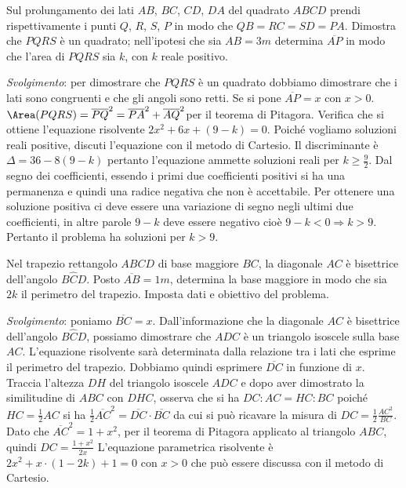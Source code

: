 \begin{multicols}{2}
\begin{esercizio}
 \label{ese:3.170}
Sul prolungamento dei lati $ AB $, $ BC $, $ CD $, $ DA $ del quadrato $ ABCD $ prendi rispettivamente i punti $ Q $, $ R $, $ S $, $ P $ in modo che $ QB=RC=SD=PA $. Dimostra che $ PQRS $ è un quadrato; nell'ipotesi che sia $AB = 3\unit{m}$ determina $\overline {AP}$ in modo che l'area di $ PQRS $ sia $ k $, con $ k $ reale positivo.
\begin{center}
 
\end{center}
\emph{Svolgimento}:
per dimostrare che $ PQRS $ è un quadrato dobbiamo dimostrare che i lati sono
congruenti e che gli angoli sono retti. Se si pone $\overline{AP} = x$ con $x > 0$.
$\Area(PQRS)= \overline {PQ}^{2} = \overline {PA}^{2} + \overline{AQ}^{2}$per il teorema di Pitagora.
Verifica che si ottiene l'equazione risolvente $2 x^{2} + 6 x + (9-k) = 0$. Poiché vogliamo soluzioni reali positive, discuti l'equazione con il metodo di Cartesio. Il discriminante è $\Delta = 36-8 (9-k)$ pertanto l'equazione ammette soluzioni reali per $k \geq \frac{9}{2}$. Dal segno dei coefficienti, essendo i primi due coefficienti positivi si ha una permanenza e quindi una radice negativa che non è accettabile. Per ottenere una soluzione positiva ci deve essere una variazione di segno negli ultimi due coefficienti, in altre parole $9-k$ deve essere negativo cioè $9-k < 0 \Rightarrow k > 9$. Pertanto il problema ha soluzioni per $k > 9$.
\end{esercizio}

\begin{esercizio}
 \label{ese:3.171}
Nel trapezio rettangolo $ ABCD $ di base maggiore $ BC $, la diagonale $ AC $ è bisettrice dell'angolo $B \widehat {C} D$. Posto $\overline {AB} = 1\unit{m}$, determina la base maggiore in modo che sia $ 2k $ il perimetro del trapezio. Imposta dati e obiettivo del problema.
\begin{center}
 
\end{center}
\emph{Svolgimento}: poniamo $\overline {BC} = x$. Dall'informazione che la diagonale $ AC $ è bisettrice dell'angolo $B \widehat {C} D$, possiamo dimostrare che $ ADC $ è un triangolo isoscele sulla base $ AC $. L'equazione risolvente sarà determinata dalla relazione tra i lati che esprime il perimetro del trapezio. Dobbiamo quindi esprimere $\overline {DC}$ in funzione di $ x $. Traccia l'altezza $ DH $ del triangolo isoscele $ ADC $ e dopo aver dimostrato la similitudine di $ ABC $ con $ DHC $, osserva che si ha $DC : AC = HC : BC$ poiché $HC = \frac{1}{2} AC$ si ha $\frac{1}{2} \overline {AC}^{2} = \overline {DC} \cdot \overline {BC}$ da cui si può ricavare la misura di $ DC = \frac{1}{2} \frac{AC^{2}}{BC}$. Dato che $\overline {AC}^{2}=1+x^2$, per il teorema di Pitagora applicato al triangolo $ ABC $, quindi $ DC = \frac{1 + x^2} {2 x} $ L'equazione parametrica risolvente è $2 x^{2} + x \cdot (1-2 k) + 1 = 0$ con $x > 0$ che può essere discussa con il metodo di Cartesio.
\end{esercizio}


\end{multicols}
